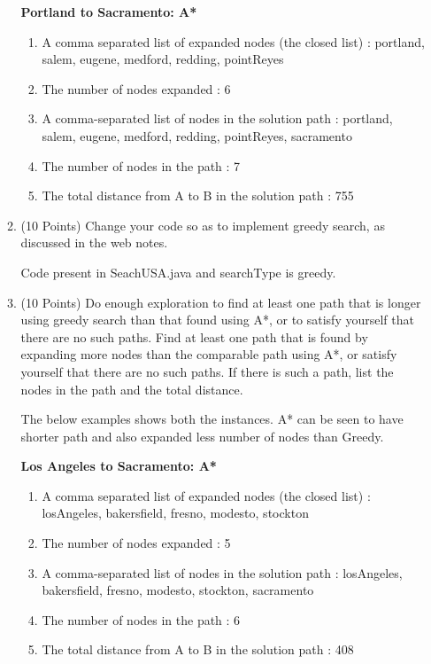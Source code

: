 \documentclass[letterpaper]{article}
\begin{document}
\begin{enumerate}
\begin{enumerate}
\begin{answer}
		\textbf{Portland to Sacramento: A*}
		\begin{enumerate}
			\item A comma separated list of expanded nodes (the closed list) : 
			portland, salem, eugene, medford, redding, pointReyes
			\item The number of nodes expanded : 
			6
			\item A comma-separated list of nodes in the solution path :
			portland, salem, eugene, medford, redding, pointReyes, sacramento
			\item The number of nodes in the path : 
			7
			\item The total distance from A to B in the solution path : 
			755
		\end{enumerate}
	  \end{answer}
	  \bigskip
	  
	  \item (10 Points) Change your code so as to implement greedy search, as
	  discussed in the web notes.
	  \begin{answer}
	  	Code present in SeachUSA.java and searchType is greedy.
	  \end{answer}
	  \bigskip
	  
	  \item (10 Points) Do enough exploration to find at least one path that is
	  longer using greedy search than that found using A*, 
	  or to satisfy yourself that there are no such paths. 
	  Find at least one path that is found by expanding more nodes than the comparable path using A*, 
	  or satisfy yourself that there are no such paths. 
	  If there is such a path, list the nodes in the path and the total distance.
	  \begin{answer}
	  	The below examples shows both the instances. A* can be seen to have shorter
	  	path and also expanded less number of nodes than Greedy. 
	  	\bigskip
	  	
	  	\textbf{Los Angeles to Sacramento: A*}
		\begin{enumerate}
			\item A comma separated list of expanded nodes (the closed list) : 
			losAngeles, bakersfield, fresno, modesto, stockton
			\item The number of nodes expanded : 
			5
			\item A comma-separated list of nodes in the solution path :
			losAngeles, bakersfield, fresno, modesto, stockton, sacramento
			\item The number of nodes in the path : 
			6
			\item The total distance from A to B in the solution path : 
			408
		\end{enumerate}
		\bigskip
		

\end{answer}
\end{enumerate}
\end{enumerate}
\end{document}
